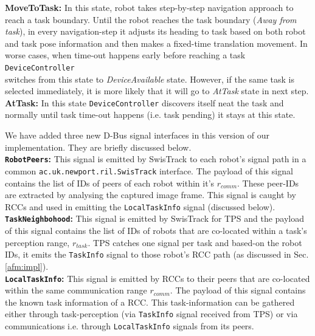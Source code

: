 \documentclass[final,5p,times,twocolumn]{elsarticle}
\begin{document}
\textbf{MoveToTask: }
In this state, robot takes step-by-step navigation approach to reach a task boundary. Until the robot reaches the task boundary ({\em Away from task}), in every navigation-step it adjusts its heading to task based on both  robot and task pose information and then makes a fixed-time translation movement. In worse cases, when time-out happens early before reaching a task  \texttt{DeviceController}\\ switches from this state to\textit{ DeviceAvailable} state. However, if the same task is selected immediately, it is more likely that it will go to \textit{AtTask} state in next step.
\textbf{AtTask: }
In this state  \texttt{DeviceController} discovers itself neat the task and normally until task time-out happens (i.e. task pending) it stays at this state.

We have added three new D-Bus signal interfaces in this version of our implementation. They are briefly discussed below.\\
\textbf{\texttt{RobotPeers}: }This signal is emitted by SwisTrack to each robot's signal path in a common \texttt{ac.uk.newport.ril.SwisTrack} interface. The payload of this signal contains the list of IDs of peers of each robot within it's $r_{comm}$.  These peer-IDs are extracted by analysing the captured image frame.  This signal is caught by RCCs and used in emitting the \texttt{LocalTaskInfo} signal (discussed below).\\
\textbf{\texttt{TaskNeighbohood}: }This signal is emitted by SwisTrack for TPS and the payload of this signal contains the list of IDs of robots that are co-located within a task's perception range, $r_{task}$. TPS catches one signal per task and based-on the robot IDs, it emits the \texttt{TaskInfo} signal to those robot's RCC path (as discussed in Sec. \ref{afm:impl}).\\ 
\textbf{\texttt{LocalTaskInfo}: }This signal is emitted by RCCs to their peers that are co-located within the same communication range $r_{comm}$. The payload of this signal contains the known task information of a  RCC. This task-information can be gathered either through task-perception (via \texttt{TaskInfo} signal received from TPS) or via communications i.e. through \texttt{LocalTaskInfo} signals from its peers.
\end{document}
